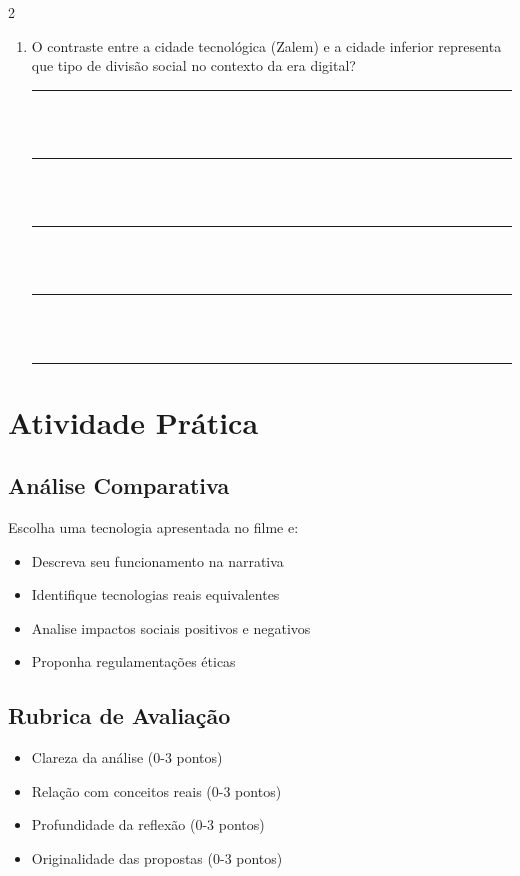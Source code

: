 \documentclass[11pt]{article}
\begin{document}
\begin{multicols}{2}
\begin{enumerate}[leftmargin=*, label=\arabic*., series=questoes]
\item O contraste entre a cidade tecnológica (Zalem) e a cidade inferior representa que tipo de divisão social no contexto da era digital?

\vspace{0.5cm}
\noindent\rule{\linewidth}{0.4pt}\\
\vspace{0.1cm}\\
\noindent\rule{\linewidth}{0.4pt}\\
\vspace{0.1cm}\\
\noindent\rule{\linewidth}{0.4pt}\\
\vspace{0.1cm}\\
\noindent\rule{\linewidth}{0.4pt}\\
\vspace{0.1cm}\\
\noindent\rule{\linewidth}{0.4pt}

\end{enumerate}

\section*{Atividade Prática}

\subsection*{Análise Comparativa}
Escolha uma tecnologia apresentada no filme e:
\begin{itemize}
\item Descreva seu funcionamento na narrativa
\item Identifique tecnologias reais equivalentes
\item Analise impactos sociais positivos e negativos
\item Proponha regulamentações éticas
\end{itemize}

\subsection*{Rubrica de Avaliação}
\begin{itemize}
\item Clareza da análise (0-3 pontos)
\item Relação com conceitos reais (0-3 pontos)
\item Profundidade da reflexão (0-3 pontos)
\item Originalidade das propostas (0-3 pontos)
\end{itemize}

\end{multicols}
\end{document}

